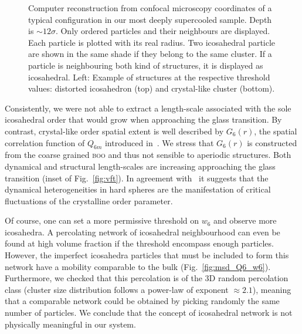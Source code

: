 \documentclass[11pt,a4paper]{article}
\begin{document}
\begin{figure}
	\caption{Computer reconstruction from confocal microscopy coordinates of a typical configuration in our most deeply supercooled sample. Depth is $\sim 12\sigma$. Only ordered particles and their neighbours are displayed. Each particle is plotted with its real radius. Two icosahedral particle are shown in the same shade if they belong to the same cluster. If a particle is neighbouring both kind of structures, it is displayed as icosahedral. Left: Example of structures at the respective threshold values: distorted icosahedron (top) and crystal-like cluster (bottom).}
	\label{fig:3D}
\end{figure}

Consistently, we were not able to extract a length-scale associated with the sole icosahedral order that would grow when approaching the glass transition. By contrast, crystal-like order spatial extent is well described by $G_6(r)$, the spatial correlation function of $Q_{6 m}$ introduced in~\citep{tanaka2010critical}. We stress that $G_6(r)$ is constructed from the coarse grained \textsc{boo} and thus not sensible to aperiodic structures. Both dynamical and structural length-scales are increasing approaching the glass transition (inset of Fig.~\ref{fig:vft}). In agreement with~\citep{tanaka2010critical} it suggests that the dynamical heterogeneities in hard spheres are the manifestation of critical fluctuations of the crystalline order parameter.

Of course, one can set a more permissive threshold on $w_6$ and observe more icosahedra. A percolating network of icosahedral neighbourhood can even be found at high volume fraction if the threshold encompass enough particles. However, the imperfect icosahedra particles that must be included to form this network have a mobility comparable to the bulk (Fig.~\ref{fig:msd_Q6_w6}). Furthermore, we checked that this percolation is of the 3D random percolation class (cluster size distribution follows a power-law of exponent $\approx 2.1$), meaning that a comparable network could be obtained by picking randomly the same number of particles. We conclude that the concept of icosahedral network is not physically meaningful in our system.
\end{document}
